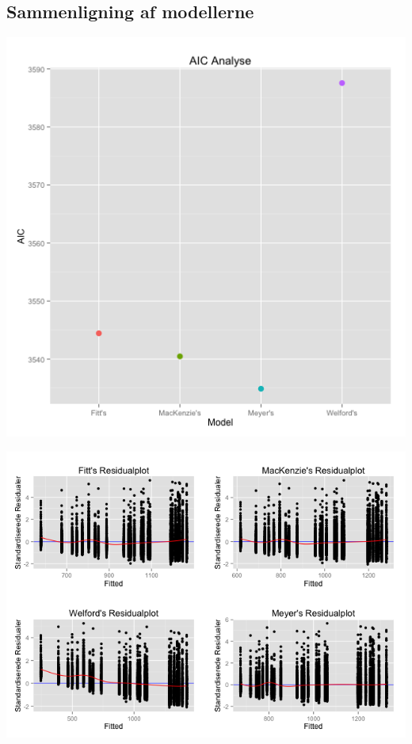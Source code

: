 \newpage
{}
\subsection*{Sammenligning af modellerne}
\begin{minipage}{\textwidth}
	\centering
	\includegraphics[width=.75\textwidth]{images/plots/plot_analyse_aic}
	\label{fig:plot_analyse_aic}
\end{minipage}

\begin{landscape}
\begin{minipage}{\textwidth}
	\centering
	\includegraphics[]{images/plots/standardResidualsVsFitted}
	\label{fig:plot_qq_meyer}
\end{minipage}
\end{landscape}


\nocite{*}
\newpage

\printbibliography

